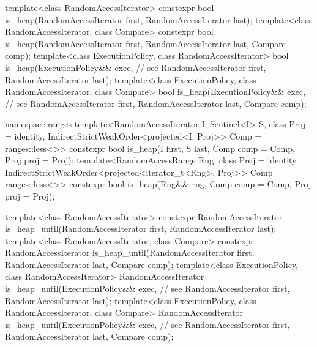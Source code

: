 \begin{codeblock}
  template<class RandomAccessIterator>
    constexpr bool is_heap(RandomAccessIterator first, RandomAccessIterator last);
  template<class RandomAccessIterator, class Compare>
    constexpr bool is_heap(RandomAccessIterator first, RandomAccessIterator last,
                           Compare comp);
  template<class ExecutionPolicy, class RandomAccessIterator>
    bool is_heap(ExecutionPolicy&& exec, // see 
                 RandomAccessIterator first, RandomAccessIterator last);
  template<class ExecutionPolicy, class RandomAccessIterator, class Compare>
    bool is_heap(ExecutionPolicy&& exec, // see 
                 RandomAccessIterator first, RandomAccessIterator last,
                 Compare comp);
\end{codeblock}\begin{addedblock}\begin{codeblock}
  namespace ranges {
    template<RandomAccessIterator I, Sentinel<I> S, class Proj = identity,
        IndirectStrictWeakOrder<projected<I, Proj>> Comp = ranges::less<>>
      constexpr bool is_heap(I first, S last, Comp comp = Comp{}, Proj proj = Proj{});
    template<RandomAccessRange Rng, class Proj = identity,
        IndirectStrictWeakOrder<projected<iterator_t<Rng>, Proj>> Comp = ranges::less<>>
      constexpr bool is_heap(Rng&& rng, Comp comp = Comp{}, Proj proj = Proj{});
  }
\end{codeblock}\end{addedblock}\begin{codeblock}
  template<class RandomAccessIterator>
    constexpr RandomAccessIterator
      is_heap_until(RandomAccessIterator first, RandomAccessIterator last);
  template<class RandomAccessIterator, class Compare>
    constexpr RandomAccessIterator
      is_heap_until(RandomAccessIterator first, RandomAccessIterator last,
                    Compare comp);
  template<class ExecutionPolicy, class RandomAccessIterator>
    RandomAccessIterator
      is_heap_until(ExecutionPolicy&& exec, // see 
                    RandomAccessIterator first, RandomAccessIterator last);
  template<class ExecutionPolicy, class RandomAccessIterator, class Compare>
    RandomAccessIterator
      is_heap_until(ExecutionPolicy&& exec, // see 
                    RandomAccessIterator first, RandomAccessIterator last,
                    Compare comp);
\end{codeblock}\begin{addedblock}\begin{codeblock}

\end{codeblock}
\end{addedblock}
